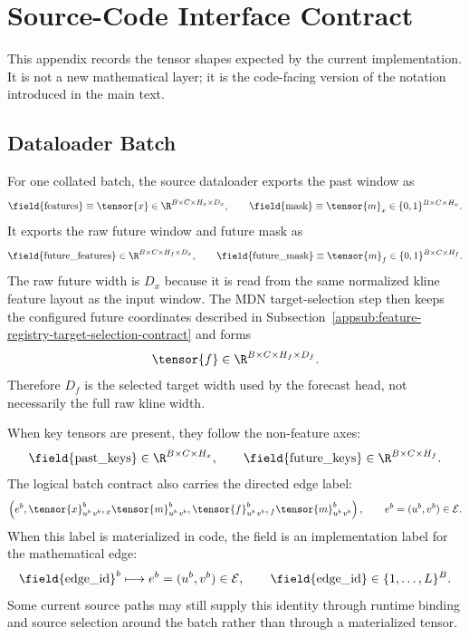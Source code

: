 \section{Source-Code Interface Contract}
\label{app:source-interface-contract}

This appendix records the tensor shapes expected by the current implementation.
It is not a new mathematical layer; it is the code-facing version of the
notation introduced in the main text.%

\subsection{Dataloader Batch}
\label{appsub:dataloader-batch-contract}

For one collated batch, the source dataloader exports the past window as
\[
  \text{\field{features}}
  \equiv
  \tensor{x}
  \in
  \R^{B \times C \times H_x \times D_x},
  \qquad
  \text{\field{mask}}
  \equiv
  \tensor{m}_x
  \in
  \{0,1\}^{B \times C \times H_x}.
\]
It exports the raw future window and future mask as
\[
  \text{\field{future\_features}}
  \in
  \R^{B \times C \times H_f \times D_x},
  \qquad
  \text{\field{future\_mask}}
  \equiv
  \tensor{m}_f
  \in
  \{0,1\}^{B \times C \times H_f}.
\]
The raw future width is $D_x$ because it is read from the same normalized kline
feature layout as the input window.  The MDN target-selection step then keeps
the configured future coordinates described in
Subsection~\ref{appsub:feature-registry-target-selection-contract} and forms
\[
  \tensor{f}
  \in
  \R^{B \times C \times H_f \times D_f}.
\]
Therefore $D_f$ is the selected target width used by the forecast head, not
necessarily the full raw kline width.

When key tensors are present, they follow the non-feature axes:
\[
  \text{\field{past\_keys}}
  \in
  \R^{B \times C \times H_x},
  \qquad
  \text{\field{future\_keys}}
  \in
  \R^{B \times C \times H_f}.
\]
The logical batch contract also carries the directed edge label:
\[
  \left(
    e^{b},
    \tensor{x}^{b}_{u^{b}\,v^{b}},
    {}_{x}\tensor{m}^{b}_{u^{b}\,v^{b}},
    \tensor{f}^{b}_{u^{b}\,v^{b}},
    {}_{f}\tensor{m}^{b}_{u^{b}\,v^{b}}
  \right),
  \qquad
  e^{b}=(u^{b},v^{b})\in\mathcal{E}.
\]
When this label is materialized in code, the field  is an
implementation label for the mathematical edge:
\[
  \text{\field{edge\_id}}^{b}
  \longmapsto
  e^{b}=(u^{b},v^{b})\in\mathcal{E},
  \qquad
  \text{\field{edge\_id}}\in\{1,\ldots,L\}^{B}.
\]
Some current source paths may still supply this identity through runtime binding
and source selection around the batch rather than through a materialized tensor.

